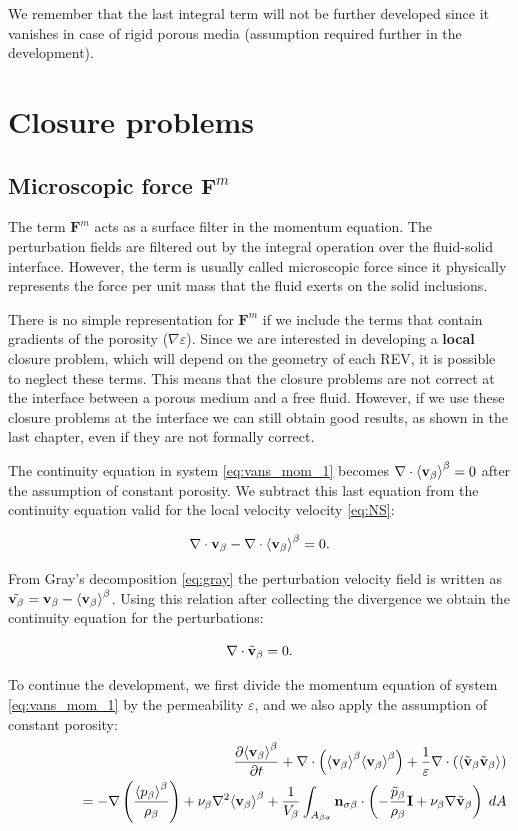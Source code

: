 We remember that the last integral term will not be further developed since it vanishes in case of rigid porous media (assumption required further in the development).



\section{Closure problems}

\subsection{Microscopic force $\mathbf{F}^m$}
\label{ch:closure_fm}
The term $\mathbf{F}^m$ acts as a surface filter in the momentum equation. The perturbation fields are filtered out by the integral operation over the fluid-solid interface. However, the term is usually called microscopic force since it physically represents the force per unit mass that the fluid exerts on the solid inclusions.

There is no simple representation for $\mathbf{F}^m$ if we include the terms that contain gradients of the porosity ($\nabla \varepsilon$).
Since we are interested in developing a \textbf{local} closure problem, which will depend on the geometry of each REV, it is possible to neglect these terms.
This means that the closure problems are not correct at the interface between a porous medium and a free fluid. 
However, if we use these closure problems at the interface we can still obtain good results, as shown in the last chapter, even if they are not formally correct.

The continuity equation in system \eqref{eq:vans_mom_1} becomes $ \nabla \cdot  {\left< \textbf{v}_{\beta}\right>}^{\beta}=0$ after the assumption of constant porosity.
We subtract this last equation from the continuity equation valid for the local velocity velocity \eqref{eq:NS}:

$$
\nabla \cdot  \textbf{v}_{\beta} - \nabla \cdot  {\left< \textbf{v}_{\beta}\right>}^{\beta} = 0.
$$

From Gray's decomposition \eqref{eq:gray} the perturbation velocity field is written as $\tilde{\textbf{v}_{\beta}} = \textbf{v}_{\beta} - {\left< \textbf{v}_{\beta} \right>}^{\beta}$. Using this relation after collecting the divergence we obtain the continuity equation for the perturbations:

\begin{equation}
\nabla \cdot \tilde{\textbf{v}}_{\beta} = 0.
\end{equation}

\newpage 
\noindent To continue the development, we first divide the momentum equation of system \eqref{eq:vans_mom_1} by the permeability $\varepsilon$, and we also apply the assumption of constant porosity:
\begin{eqnarray}
&& \dfrac{\partial {\left< \textbf{v}_{\beta}\right>}^{\beta}}{\partial t} + \nabla \cdot \left({\left< \textbf{v}_{\beta} \right>}^{\beta}{\left< \textbf{v}_{\beta} \right>}^{\beta}\right)   + \dfrac{1}{\varepsilon}\nabla \cdot \left({\left< \tilde{\textbf{v}}_{\beta} \tilde{\textbf{v}}_{\beta} \right>}\right)   \nonumber \\
&& \qquad \qquad = - \nabla \left(\dfrac{{\left< p_{\beta} \right>}^{\beta}}{\rho_{\beta}}\right) + \nu_{\beta}  \nabla^2 {\left< \textbf{v}_{\beta} \right>}^{\beta} + \dfrac{1}{V_\beta} \displaystyle\int_{A_{\beta \sigma}} \mathbf{n}_{\sigma \beta}  \cdot \left(-\dfrac{\tilde{p}_{\beta}}{\rho_{\beta}} \mathbf{I}  + \nu_{\beta} \nabla \tilde{\textbf{v}}_{\beta} \right) \;dA  \nonumber
\end{eqnarray}


